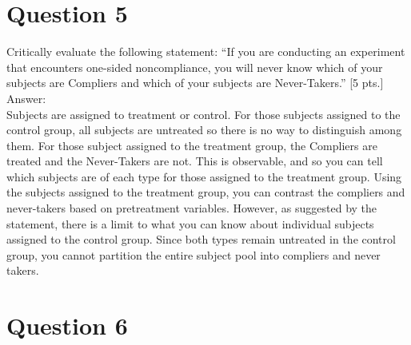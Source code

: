 \documentclass[11pt,notitlepage]{article}\usepackage[]{graphicx}\usepackage[]{color}
\makeatletter
\newenvironment{kframe}{%
 \def\at@end@of@kframe{}%
 \ifinner\ifhmode%
  \def\at@end@of@kframe{\end{minipage}}%
  \begin{minipage}{\columnwidth}%
 \fi\fi%
 \def\FrameCommand##1{\hskip\@totalleftmargin \hskip-\fboxsep
 \colorbox{shadecolor}{##1}\hskip-\fboxsep
     \hskip-\linewidth \hskip-\@totalleftmargin \hskip\columnwidth}%
 \MakeFramed {\advance\hsize-\width
   \@totalleftmargin\z@ \linewidth\hsize
   \@setminipage}}%
 {\par\unskip\endMakeFramed%
 \at@end@of@kframe}
\newenvironment{knitrout}{}{} %
\makeatother
\begin{document}
\section*{Question 5}
Critically evaluate the following statement: ``If you are conducting an experiment that encounters one-sided noncompliance, you will never know which of your subjects are Compliers and which of your subjects are Never-Takers.'' [5 pts.]\\
Answer:\\
Subjects are assigned to treatment or control. For those subjects assigned to the control group, all subjects are untreated so there is no way to distinguish among them. For those subject assigned to the treatment group, the Compliers are treated and the Never-Takers are not. This is observable, and so you can tell which subjects are of each type for those assigned to the treatment group. Using the subjects assigned to the treatment group, you can contrast the compliers and never-takers based on pretreatment variables.  However, as suggested by the statement, there is a limit to what you can know about individual subjects assigned to the control group. Since both types remain untreated in the control group, you cannot partition the entire subject pool into compliers and never takers.

\section*{Question 6}
\begin{knitrout}
\color{fgcolor}\begin{kframe}
\begin{verbatim}






\end{verbatim}
\end{kframe}
\end{knitrout}
\end{document}
